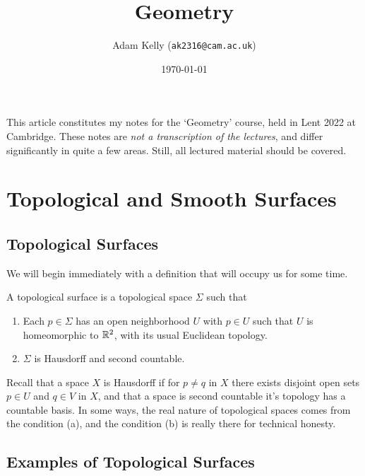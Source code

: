 \documentclass[a4paper]{scrartcl}
\title{Geometry}
\author{Adam Kelly (\texttt{ak2316@cam.ac.uk})}
\date{\today}
\begin{document}
\maketitle 


This article constitutes my notes for the `Geometry' course, held in Lent 2022 at Cambridge. These notes are \emph{not a transcription of the lectures}, and differ significantly in quite a few areas. Still, all lectured material should be covered.



\tableofcontents

\section{Topological and Smooth Surfaces}

\subsection{Topological Surfaces}

We will begin immediately with a definition that will occupy us for some time.

\begin{definition}
    A topological surface is a topological space $\Sigma$ such that
    \begin{enumerate}[label=(\roman*)]
        \item Each $p \in \Sigma$ has an open neighborhood $U$ with $p \in U$ such that $U$ is homeomorphic to $\mathbb{R}^2$, with its usual Euclidean topology.
        \item $\Sigma$ is Hausdorff and second countable.
    \end{enumerate}    
\end{definition}

Recall that a space $X$ is Hausdorff if for $p \neq q$ in $X$ there exists disjoint open sets $p \in U$ and $q \in V$ in $X$, and that a space is second countable it's topology has a countable basis.
In some ways, the real nature of topological spaces comes from the condition (a), and the condition (b) is really there for technical honesty.

\subsection{Examples of Topological Surfaces}
\end{document}
